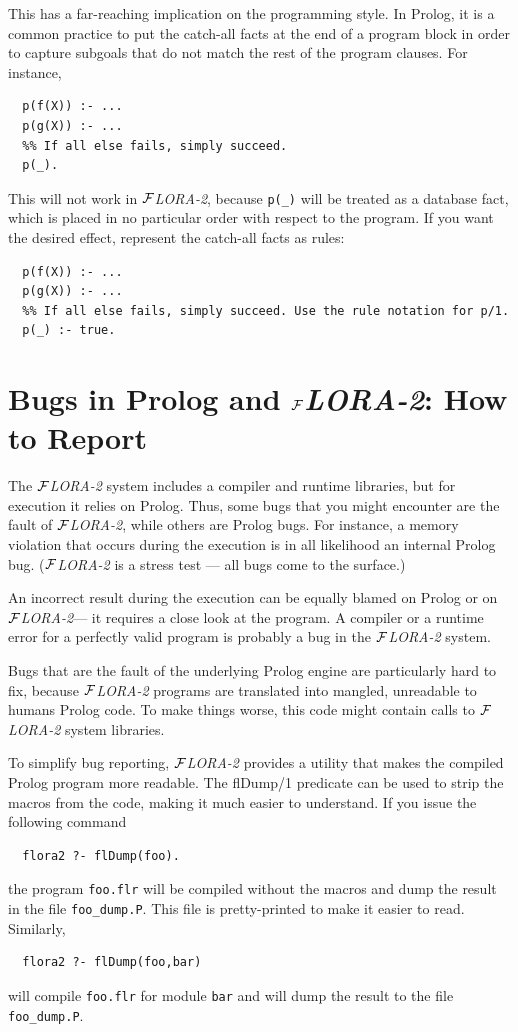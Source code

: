 \documentclass[11pt]{article}
\newcommand{\FLORA}{{\mbox{${\cal F}${\small\it LORA}\rm\emph{-2}}}\xspace}
\begin{document}
This has a far-reaching implication on the programming style.
In Prolog, it is a common practice to put the catch-all facts at the end of
a program block in order to capture subgoals that do not match the rest of
the program clauses. For instance, 
\begin{verbatim}
  p(f(X)) :- ...
  p(g(X)) :- ...
  %% If all else fails, simply succeed.
  p(_).
\end{verbatim}
This will not work in \FLORA, because {\tt p(\_)} will be treated as a
database fact, which is placed in no particular order with respect to the
program. If you want the desired effect, represent the catch-all facts as
rules: 
\begin{verbatim}
  p(f(X)) :- ...
  p(g(X)) :- ...
  %% If all else fails, simply succeed. Use the rule notation for p/1.
  p(_) :- true.
\end{verbatim}


\section{Bugs in Prolog and \FLORA: How to Report}

The \FLORA system includes a compiler and runtime libraries, but for
execution it relies on Prolog. Thus, some bugs that you might encounter are
the fault of \FLORA, while others are Prolog bugs. For instance, a memory
violation that occurs during the execution is in all likelihood an internal
Prolog bug. (\FLORA is a stress test --- all bugs come to the surface.)

An incorrect result during the execution can be equally blamed on Prolog or
on \FLORA --- it requires a close look at the program. A compiler or
a runtime error for a perfectly valid program is probably a bug in the
\FLORA system.

Bugs that are the fault of the underlying Prolog engine are particularly
hard to fix, because \FLORA programs are translated into mangled,
unreadable to humans Prolog code.  To make things worse, this code might
contain calls to \FLORA system libraries.

To simplify bug reporting, \FLORA provides a utility that makes the compiled
Prolog program more readable. The flDump/1 predicate can be used to strip the
macros from the code, making it much easier to understand. If you issue the
following command
\begin{verbatim}
  flora2 ?- flDump(foo).  
\end{verbatim}
the program {\tt foo.flr} will be compiled without the macros and dump the
result in the file {\tt foo\_dump.P}. This file is pretty-printed to make
it easier to read. Similarly,
\begin{verbatim}
  flora2 ?- flDump(foo,bar)  
\end{verbatim}
will compile {\tt foo.flr} for module {\tt bar} and will dump the result to
the file {\tt foo\_dump.P}.
\end{document}
